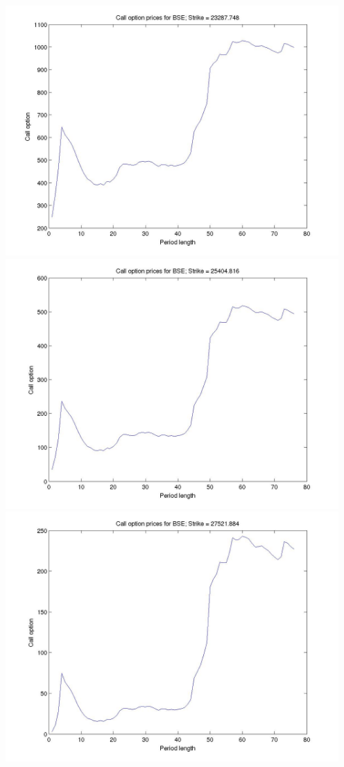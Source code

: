 \documentclass[12pt]{article}
\begin{document}
\begin{center}
      \includegraphics[width=5in]{call_strike7.jpg}
      \includegraphics[width=5in]{call_strike8.jpg}
      \includegraphics[width=5in]{call_strike9.jpg}

\end{center}
\end{document}
